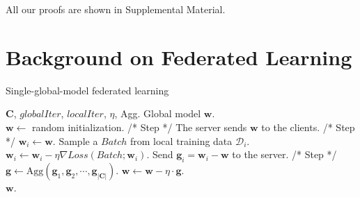 \documentclass[letterpaper]{article} %
\newcommand{\RomanNumeralCaps}[1]
{\MakeUppercase{\romannumeral #1}}
\begin{document}
All our proofs are shown in Supplemental Material.



\section{Background on Federated Learning}

\begin{algorithm}[t]
\caption{Single-global-model federated learning}\label{alg:base_alg}
\begin{algorithmic}[1]
 $\mathbf{C}$, $globalIter$, $localIter$, $\eta$, Agg.
 Global model $\mathbf{w}$.\\
\STATE $\mathbf{w} \leftarrow $ random initialization.
\STATE /* Step \RomanNumeralCaps{1} */
\STATE The server sends $\mathbf{w}$ to the clients.
\STATE /* Step \RomanNumeralCaps{2} */
\STATE $\mathbf{w}_i \leftarrow \mathbf{w}$.
\STATE Sample a $Batch$ from local training data $\mathcal{D}_i$.
\STATE $\mathbf{w}_i \leftarrow \mathbf{w}_i - \eta \nabla Loss(Batch;\mathbf{w}_i)$.
\ENDFOR
\STATE Send $\mathbf{g}_i=\mathbf{w}_i-\mathbf{w}$ to the server.
\ENDFOR
\STATE /* Step \RomanNumeralCaps{3} */
\STATE $\mathbf{g} \leftarrow \text{Agg}(\mathbf{g}_1, \mathbf{g}_2, \cdots, \mathbf{g}_{|\mathbf{C}|})$.
\STATE $\mathbf{w} \leftarrow \mathbf{w} - \eta\cdot \mathbf{g}$.
\ENDFOR\\
\RETURN $\mathbf{w}$.
\end{algorithmic}
\end{algorithm}
\end{document}
